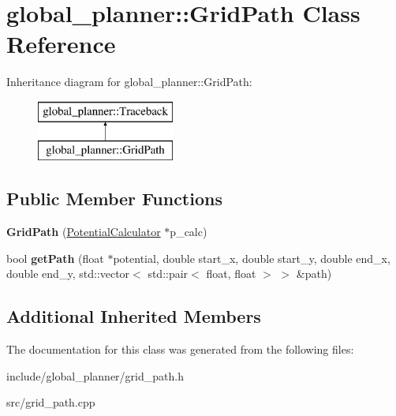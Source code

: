 \hypertarget{classglobal__planner_1_1_grid_path}{}\section{global\+\_\+planner\+:\+:Grid\+Path Class Reference}
\label{classglobal__planner_1_1_grid_path}
Inheritance diagram for global\+\_\+planner\+:\+:Grid\+Path\+:\begin{figure}[H]
\begin{center}
\leavevmode
\includegraphics[height=2.000000cm]{classglobal__planner_1_1_grid_path}
\end{center}
\end{figure}
\subsection*{Public Member Functions}
\begin{DoxyCompactItemize}
\item 
\mbox{\label{classglobal__planner_1_1_grid_path_ad4b6453a13dc23b79e684e9e2092c25c}} 
{\bfseries Grid\+Path} (\mbox{\hyperlink{classglobal__planner_1_1_potential_calculator}{Potential\+Calculator}} $\ast$p\+\_\+calc)
\item 
\mbox{\label{classglobal__planner_1_1_grid_path_a11f2838b30fdaca0e29ccff49d0e6c58}} 
bool {\bfseries get\+Path} (float $\ast$potential, double start\+\_\+x, double start\+\_\+y, double end\+\_\+x, double end\+\_\+y, std\+::vector$<$ std\+::pair$<$ float, float $>$ $>$ \&path)
\end{DoxyCompactItemize}
\subsection*{Additional Inherited Members}


The documentation for this class was generated from the following files\+:\begin{DoxyCompactItemize}
\item 
include/global\+\_\+planner/grid\+\_\+path.\+h\item 
src/grid\+\_\+path.\+cpp\end{DoxyCompactItemize}
